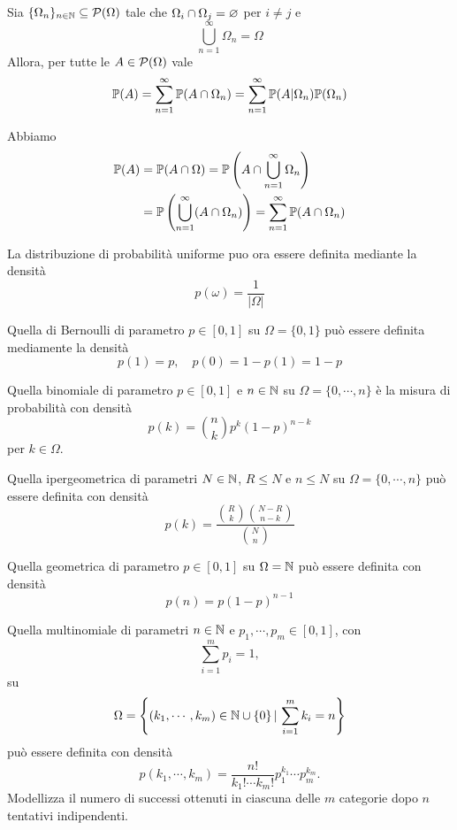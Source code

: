 \documentclass[a4paper]{article}
\begin{document}
\begin{snippettheorem}{}
    Sia \(\{\Omega_n\}_{n \in \mathbb{N}} \subseteq \mathcal P(\Omega)\)
    tale che \(\Omega_i \cap \Omega_j = \varnothing\) per \(i \neq j\) e \[
        \bigcup_{n=1}^\infty \Omega_n = \Omega
    \]
    Allora, per tutte le \(A \in \mathcal P(\Omega)\) vale
    \[
        \mathbb P(A) = \sum_{n=1}^\infty \mathbb P(A \cap \Omega_n) = \sum_{n=1}^\infty \mathbb P(A | \Omega_n) \mathbb P(\Omega_n)
    \]
\end{snippettheorem}

\begin{snippetproof}{}
    Abbiamo
    \begin{align*}
        \mathbb P(A) &= \mathbb P(A \cap \Omega) = \mathbb P\left(
            A \cap \bigcup_{n=1}^\infty \Omega_n
        \right) \\
        &= \mathbb P\left(
            \bigcup_{n=1}^\infty (A \cap \Omega_n)
        \right) = \sum_{n=1}^\infty \mathbb P(A \cap \Omega_n)
    \end{align*}
\end{snippetproof}

La distribuzione di probabilità uniforme puo ora essere definita mediante la densità
\[
    p(\omega) = \frac{1}{|\Omega|}
\]

Quella di Bernoulli di parametro \(p \in [0,1]\)
su \(\Omega = \{0,1\}\) può essere definita mediamente la densità
\[
    p(1) = p, \quad p(0) = 1 - p(1) = 1-p
\]

Quella binomiale di parametro \(p \in [0,1]\) e \(n \in \mathbb{N}\)
su \(\Omega = \{0, \cdots, n\}\)
è la misura di probabilità con densità \[
    p(k) = \binom{n}{k}p^k (1-p)^{n-k}
\]
per \(k \in \Omega\).

Quella ipergeometrica di parametri \(N \in \mathbb{N}\),
\(R \leq N\) e \(n \leq N\)
su \(\Omega = \{0, \cdots, n\}\) può essere definita con densità
\[
    p(k) = \frac{
        \binom{R}{k}\binom{N-R}{n-k}
    }{
        \binom{N}{n}
    }
\]

Quella geometrica di parametro \(p \in [0,1]\)
su \(\Omega = \mathbb{N}\) può essere definita con densità
\[
    p(n) = p(1-p)^{n-1}
\]

Quella multinomiale di parametri \(n \in \mathbb{N}\)
e \(p_1,\cdots,p_m \in [0,1]\), con
\[
    \sum_{i=1}^m p_i = 1,
\]
su
\[
    \Omega =
    \left\{
        (k_1,\cdots,k_m) \in \mathbb{N} \cup \{0\}
        \,|\,
        \sum_{i=1}^m k_i = n
    \right\}
\]
può essere definita con densità
\[
    p(k_1,\cdots,k_m)
    =
    \frac{n!}{k_1! \cdots k_m!}
    p_1^{k_1}\cdots p_m^{k_m}.
\]
Modellizza il numero di successi ottenuti in ciascuna delle \(m\)
categorie dopo \(n\) tentativi indipendenti.
\end{document}
